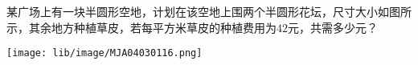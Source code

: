 某广场上有一块半圆形空地，计划在该空地上围两个半圆形花坛，尺寸大小如图所示，其余地方种植草皮，若每平方米草皮的种植费用为$42$元，共需多少元？

\begin{center}
    \texttt{[image: lib/image/MJA04030116.png]}
\end{center}